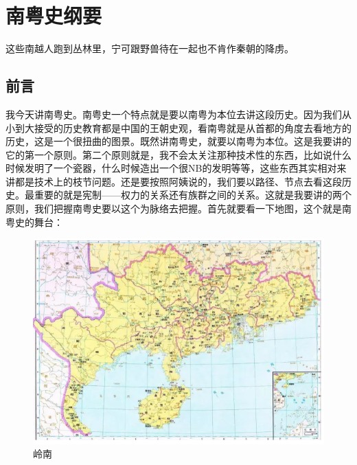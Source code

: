 \chapter[南粤史纲要]{南粤史纲要\protect{}}



\begin{quoted}这些南越人跑到丛林里，宁可跟野兽待在一起也不肯作秦朝的降虏。\end{quoted}

\section{前言}
我今天讲南粤史。南粤史一个特点就是要以南粤为本位去讲这段历史。因为我们从小到大接受的历史教育都是中国的王朝史观，看南粤就是从首都的角度去看地方的历史，这是一个很扭曲的图景。既然讲南粤史，就要以南粤为本位。这是我要讲的它的第一个原则。第二个原则就是，我不会太关注那种技术性的东西，比如说什么时候发明了一个瓷器，什么时候造出一个很NB的发明等等，这些东西其实相对来讲都是技术上的枝节问题。还是要按照阿姨说的，我们要以路径、节点去看这段历史。最重要的就是宪制——权力的关系还有族群之间的关系。这就是我要讲的两个原则，我们把握南粤史要以这个为脉络去把握。首先就要看一下地图，这个就是南粤史的舞台：

\begin{figure}
	\centering
	\includegraphics[width=\textwidth]{images/image-3}
	\caption{岭南}
\end{figure}

